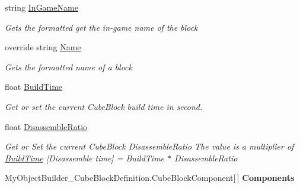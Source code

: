 \begin{DoxyCompactItemize}
\item 
string \hyperlink{class_s_e_mod_a_p_i_1_1_a_p_i_1_1_definitions_1_1_cube_blocks_1_1_block_definition_ac61c54e96ed85b12c8ac4320aea11023}{In\+Game\+Name}
\begin{DoxyCompactList}\small\item\em Gets the formatted get the in-\/game name of the block \end{DoxyCompactList}\item 
override string \hyperlink{class_s_e_mod_a_p_i_1_1_a_p_i_1_1_definitions_1_1_cube_blocks_1_1_block_definition_a31eafb04ff3103712706e547f5a6c6b8}{Name}
\begin{DoxyCompactList}\small\item\em Gets the formatted name of a block \end{DoxyCompactList}\item 
float \hyperlink{class_s_e_mod_a_p_i_1_1_a_p_i_1_1_definitions_1_1_cube_blocks_1_1_block_definition_a3ad3c26078f99bfd3cb40e3aa2e39051}{Build\+Time}
\begin{DoxyCompactList}\small\item\em Get or set the current Cube\+Block build time in second. \end{DoxyCompactList}\item 
float \hyperlink{class_s_e_mod_a_p_i_1_1_a_p_i_1_1_definitions_1_1_cube_blocks_1_1_block_definition_afa4309875fdfe02ab3c958ab5ee69e7f}{Disassemble\+Ratio}
\begin{DoxyCompactList}\small\item\em Get or Set the current Cube\+Block Disassemble\+Ratio The value is a multiplier of \hyperlink{class_s_e_mod_a_p_i_1_1_a_p_i_1_1_definitions_1_1_cube_blocks_1_1_block_definition_a3ad3c26078f99bfd3cb40e3aa2e39051}{Build\+Time} \mbox{[}Disassemble time\mbox{]} = Build\+Time $\ast$ Disassemble\+Ratio \end{DoxyCompactList}\item 
\hypertarget{class_s_e_mod_a_p_i_1_1_a_p_i_1_1_definitions_1_1_cube_blocks_1_1_block_definition_a07385a670c03a8d12ea89de3e4cf75cd}{}My\+Object\+Builder\+\_\+\+Cube\+Block\+Definition.\+Cube\+Block\+Component\mbox{[}$\,$\mbox{]} {\bfseries Components}\label{class_s_e_mod_a_p_i_1_1_a_p_i_1_1_definitions_1_1_cube_blocks_1_1_block_definition_a07385a670c03a8d12ea89de3e4cf75cd}


\end{DoxyCompactItemize}
